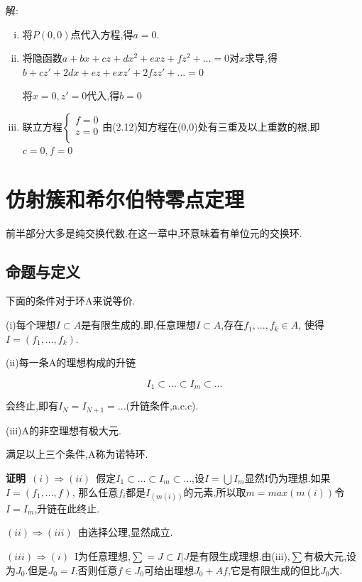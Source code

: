 \documentclass[UTF8]{book}
\begin{document}
			解:
			\begin{enumerate}[(i)]
				\item 将$P(0,0)$点代入方程,得$ a = 0 $.
				\item 将隐函数$ a+b x+c z+d x^{2}+e x z+f z^{2}+\ldots = 0 $对$ x $求导,得$ b+c z'+2d x+e z+exz'+2f zz'+\ldots = 0 $
				
				
				将$ x = 0,z' = 0 $代入,得$ b = 0 $
				\item 联立方程$
				\left\{
				\begin{aligned}
				f = 0 \\
				z = 0\\
				\end{aligned}
				\right.
				$由(2.12)知方程在(0,0)处有三重及以上重数的根,即$ c = 0,f = 0 $
			\end{enumerate}
		
		
\chapter{仿射簇和希尔伯特零点定理}
	前半部分大多是纯交换代数.在这一章中,环意味着有单位元的交换环.
	\section{命题与定义}
		下面的条件对于环A来说等价.
		
		
		(i)每个理想$I \subset A$是有限生成的.即,任意理想$I \subset A$,存在$f_{1},...,f_{k} \in A$, 使得$I=(f_{1},...,f_{k}).$
		
		
		(ii)每一条A的理想构成的升链
		
		
		\begin{equation*}
			I_{1} \subset ... \subset I_{m} \subset ...
		\end{equation*}
		
		
		会终止,即有$I_{N}=I_{N+1}=...$(升链条件,a.c.c).
		
		(iii)A的非空理想有极大元.
		
		
		满足以上三个条件,A称为诺特环.
		
		
		\textbf{证明}\ $(i) \Rightarrow (ii)$\ 假定$I_{1} \subset ... \subset I_{m} \subset ...$,设$I= \bigcup I_{m}$显然I仍为理想.如果$I=(f_{1},...,f_{})$, 那么任意$f_{i}$都是$I_(m(i))$的元素,所以取$m=max(m(i))$令$I=I_{m}$,升链在此终止.
		
		
		$(ii) \Rightarrow (iii)$\ 由选择公理,显然成立.
		
		
		$(iii) \Rightarrow (i)$\ I为任意理想,$\sum={J \subset I|J是有限生成理想}$.由(iii),$\sum$有极大元,设为$J_{0}$.但是$J_{0}=I$,否则任意$f \in J_{0}$可给出理想$J_{0}+Af$,它是有限生成的但比$J_{0}$大.
		
\end{document}
